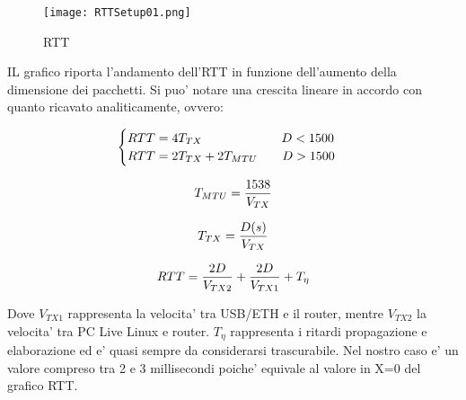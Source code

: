 \documentclass[../lab2.tex]{subfiles}
\begin{document}
    \begin{wrapfigure}{r}{0.5\textwidth}
        \centering
        \texttt{[image: RTTSetup01.png]}
        \vspace{-15pt}
        \caption{RTT}\label{Fig:data1}
    \end{wrapfigure}

            IL grafico riporta l'andamento dell'RTT in funzione dell'aumento
            della dimensione dei pacchetti.
            Si puo' notare una crescita lineare in accordo con quanto ricavato 
            analiticamente, ovvero:

            \begin{equation}
                \centering
                \begin{cases}
                    RTT = 4T_{TX} \qquad \qquad \qquad \, \, D < 1500 \\
                    RTT = 2T_{TX} + 2T_{MTU} \qquad D > 1500
                \end{cases}
            \end{equation}

            \begin{equation}
                \centering
                T_{MTU} = \frac{1538}{V_{TX}}
            \end{equation}

            \begin{equation}
                \centering
                T_{TX} = \frac{D(s)}{V_{TX}}
            \end{equation}

            \begin{equation}
                \centering
                RTT = \frac{2D}{V_{TX2}} +\frac{2D}{V_{TX1}} + T_\eta 
            \end{equation}

            \vspace{30pt}

            Dove $V_{TX1}$ rappresenta la velocita' tra USB/ETH e il router,
            mentre $V_{TX2}$ la velocita' tra PC Live Linux e router.
            $T_\eta$ rappresenta i ritardi propagazione e elaborazione ed e' quasi 
            sempre da considerarsi trascurabile. Nel nostro caso e' un
            valore compreso tra 2 e 3 millisecondi poiche' equivale al valore in X=0
            del grafico RTT. 
\end{document}
